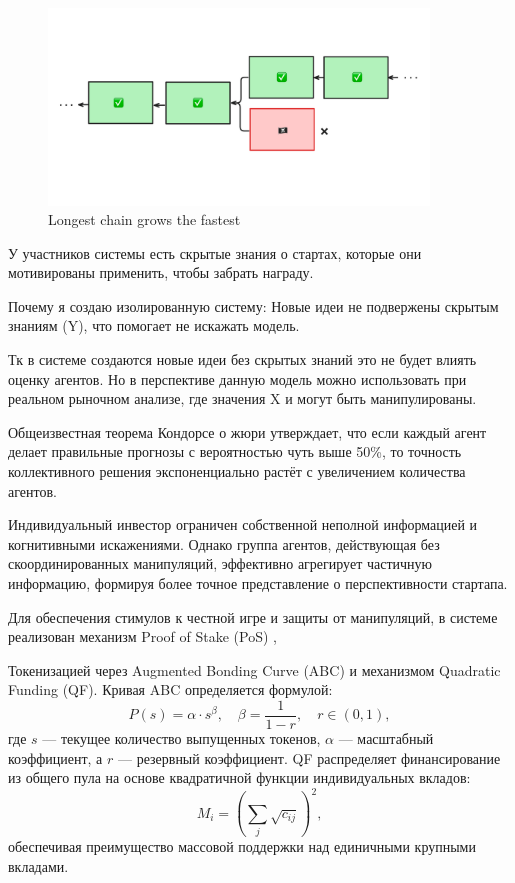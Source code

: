 \documentclass[
    14pt,
    specialist,
    candidate, %
    subf, %
    href,
    dotsinheaders=false
]{disser}
\begin{document}
\begin{figure}[h]
  \centering
  \includegraphics[width=0.9\textwidth]{./assets/longest-chain.png}
  \caption{Longest chain grows the fastest}
  \label{fig:longest-chain}
\end{figure}

У участников системы есть скрытые знания о стартах, которые они мотивированы применить, чтобы забрать награду.

Почему я создаю изолированную систему: Новые идеи не подвержены скрытым знаниям (Y), что помогает не искажать модель.

Тк в системе создаются новые идеи без скрытых знаний это не будет влиять оценку агентов. Но в перспективе данную модель можно использовать при реальном рыночном анализе, где значения X и могут быть манипулированы.

Общеизвестная теорема Кондорсе о жюри \cite{condorcet1785essay} утверждает, что если каждый агент делает правильные прогнозы с вероятностью чуть выше 50\%, то точность коллективного решения экспоненциально растёт с увеличением количества агентов.

Индивидуальный инвестор ограничен собственной неполной информацией и когнитивными искажениями. Однако группа агентов, действующая без скоординированных манипуляций, эффективно агрегирует частичную информацию, формируя более точное представление о перспективности стартапа.


Для обеспечения стимулов к честной игре и защиты от манипуляций, в системе реализован механизм Proof of Stake (PoS) \cite{king2012ppcoin},

Токенизацией через Augmented Bonding Curve (ABC) и механизмом Quadratic Funding (QF). Кривая ABC определяется формулой:
\[
  P(s) = \alpha \cdot s^\beta, \quad \beta = \frac{1}{1-r}, \quad r \in (0,1),
\]
где $s$ — текущее количество выпущенных токенов, $\alpha$ — масштабный коэффициент, а $r$ — резервный коэффициент. QF распределяет финансирование из общего пула на основе квадратичной функции индивидуальных вкладов:
\[
  M_i = \left(\sum_j \sqrt{c_{ij}}\right)^2,
\]
обеспечивая преимущество массовой поддержки над единичными крупными вкладами.
\end{document}
